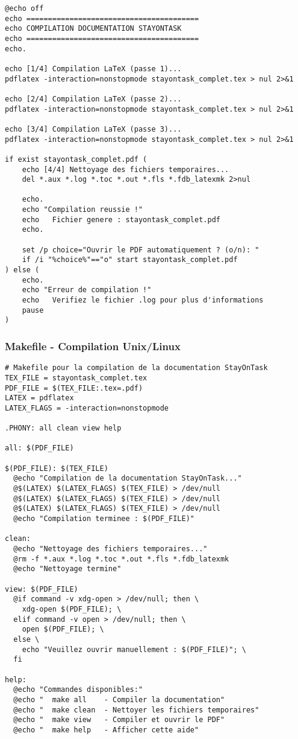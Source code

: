 \documentclass[12pt,a4paper]{article}
\begin{document}
\begin{lstlisting}[caption=Script de compilation automatique - compile\_final.bat]
@echo off
echo ========================================
echo COMPILATION DOCUMENTATION STAYONTASK
echo ========================================
echo.

echo [1/4] Compilation LaTeX (passe 1)...
pdflatex -interaction=nonstopmode stayontask_complet.tex > nul 2>&1

echo [2/4] Compilation LaTeX (passe 2)...
pdflatex -interaction=nonstopmode stayontask_complet.tex > nul 2>&1

echo [3/4] Compilation LaTeX (passe 3)...
pdflatex -interaction=nonstopmode stayontask_complet.tex > nul 2>&1

if exist stayontask_complet.pdf (
    echo [4/4] Nettoyage des fichiers temporaires...
    del *.aux *.log *.toc *.out *.fls *.fdb_latexmk 2>nul
    
    echo.
    echo "Compilation reussie !"
    echo   Fichier genere : stayontask_complet.pdf
    echo.
    
    set /p choice="Ouvrir le PDF automatiquement ? (o/n): "
    if /i "%choice%"=="o" start stayontask_complet.pdf
) else (
    echo.
    echo "Erreur de compilation !"
    echo   Verifiez le fichier .log pour plus d'informations
    pause
)
\end{lstlisting}

\subsubsection{Makefile - Compilation Unix/Linux}

\begin{lstlisting}[caption=Makefile pour compilation Unix/Linux]
# Makefile pour la compilation de la documentation StayOnTask
TEX_FILE = stayontask_complet.tex
PDF_FILE = $(TEX_FILE:.tex=.pdf)
LATEX = pdflatex
LATEX_FLAGS = -interaction=nonstopmode

.PHONY: all clean view help

all: $(PDF_FILE)

$(PDF_FILE): $(TEX_FILE)
  @echo "Compilation de la documentation StayOnTask..."
  @$(LATEX) $(LATEX_FLAGS) $(TEX_FILE) > /dev/null
  @$(LATEX) $(LATEX_FLAGS) $(TEX_FILE) > /dev/null
  @$(LATEX) $(LATEX_FLAGS) $(TEX_FILE) > /dev/null
  @echo "Compilation terminee : $(PDF_FILE)"

clean:
  @echo "Nettoyage des fichiers temporaires..."
  @rm -f *.aux *.log *.toc *.out *.fls *.fdb_latexmk
  @echo "Nettoyage termine"

view: $(PDF_FILE)
  @if command -v xdg-open > /dev/null; then \
    xdg-open $(PDF_FILE); \
  elif command -v open > /dev/null; then \
    open $(PDF_FILE); \
  else \
    echo "Veuillez ouvrir manuellement : $(PDF_FILE)"; \
  fi

help:
  @echo "Commandes disponibles:"
  @echo "  make all    - Compiler la documentation"
  @echo "  make clean  - Nettoyer les fichiers temporaires"
  @echo "  make view   - Compiler et ouvrir le PDF"
  @echo "  make help   - Afficher cette aide"
\end{lstlisting}
\end{document}
